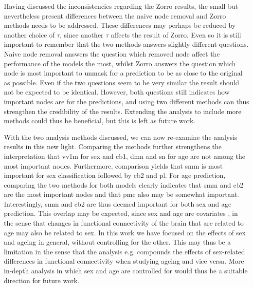 Having discussed the inconsistencies regarding the Zorro results, the small but nevertheless present differences between the naive node removal and Zorro methods needs to be addressed. These differences may perhaps be reduced by another choice of $\tau$, since another $\tau$ affects the result of Zorro. Even so it is still important to remember that the two methods answers slightly different questions. Naive node removal answers the question which removed node affect the performance of the models the most, whilst Zorro answers the question which node is most important to unmask for a prediction to be as close to the original as possible. Even if the two questions seem to be very similar the result should not be expected to be identical. However, both questions still indicates how important nodes are for the predictions, and using two different methods can thus strengthen the credibility of the results. Extending the analysis to include more methods could thus be beneficial, but this is left as future work.


With the two analysis methods discussed, we can now re-examine the analysis results in this new light. Comparing the methods further strengthens the interpretation that \acrshort{vv1m} for sex and \acrshort{cb1}, \acrshort{dmn} and \acrshort{sn} for age are not among the most important nodes. Furthermore, comparison yields that \acrshort{smm} is most important for sex classification followed by \acrshort{cb2} and \acrshort{pl}. For age prediction, comparing the two methods for both models clearly indicates that \acrshort{smm} and \acrshort{cb2} are the most important nodes and that \acrshort{pmc} also may be somewhat important. Interestingly, \acrshort{smm} and \acrshort{cb2} are thus deemed important for both sex and age prediction. This overlap may be expected, since sex and age are covariates \cite{zhang_covariates}, in the sense that changes in functional connectivity of the brain that are related to age may also be related to sex. In this work we have focused on the effects of sex and ageing in general, without controlling for the other. This may thus be a limitation in the sense that the analysis e.g. compounds the effects of sex-related differences in functional connectivity when studying ageing and vice versa. More in-depth analysis in which sex and age are controlled for would thus be a suitable direction for future work.

